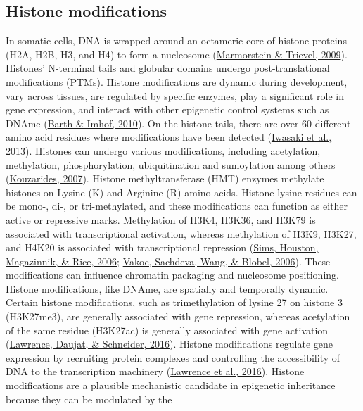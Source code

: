 \documentclass[12pt,twoside]{reedthesis}
\begin{document}
\hypertarget{histone-modifications}{%
\subsection*{Histone modifications}\label{histone-modifications}}

In somatic cells, DNA is wrapped around an octameric core of histone
proteins (H2A, H2B, H3, and H4) to form a nucleosome (\protect\hyperlink{ref-marmorstein2009}{Marmorstein \& Trievel, 2009}).
Histones' N-terminal tails and globular domains undergo
post-translational modifications (PTMs). Histone modifications are
dynamic during development, vary across tissues, are regulated by
specific enzymes, play a significant role in gene expression, and
interact with other epigenetic control systems such as DNAme
(\protect\hyperlink{ref-barth2010}{Barth \& Imhof, 2010}). On the histone tails, there are over 60 different amino
acid residues where modifications have been detected (\protect\hyperlink{ref-iwasaki2013}{Iwasaki et al., 2013}).
Histones can undergo various modifications, including acetylation,
methylation, phosphorylation, ubiquitination and sumoylation among
others (\protect\hyperlink{ref-kouzarides2007}{Kouzarides, 2007}). Histone methyltransferase (HMT) enzymes
methylate histones on Lysine (K) and Arginine (R) amino acids. Histone
lysine residues can be mono-, di-, or tri-methylated, and these
modifications can function as either active or repressive marks.
Methylation of H3K4, H3K36, and H3K79 is associated with transcriptional
activation, whereas methylation of H3K9, H3K27, and H4K20 is associated
with transcriptional repression (\protect\hyperlink{ref-sims2006}{Sims, Houston, Magazinnik, \& Rice, 2006}; \protect\hyperlink{ref-vakoc2006}{Vakoc, Sachdeva, Wang, \& Blobel, 2006}). These
modifications can influence chromatin packaging and nucleosome
positioning. Histone modifications, like DNAme, are spatially and
temporally dynamic. Certain histone modifications, such as
trimethylation of lysine 27 on histone 3 (H3K27me3), are generally
associated with gene repression, whereas acetylation of the same residue
(H3K27ac) is generally associated with gene activation (\protect\hyperlink{ref-lawrence2016}{Lawrence, Daujat, \& Schneider, 2016}).
Histone modifications regulate gene expression by recruiting protein
complexes and controlling the accessibility of DNA to the transcription
machinery (\protect\hyperlink{ref-lawrence2016}{Lawrence et al., 2016}). Histone modifications are a plausible
mechanistic candidate in epigenetic inheritance because they can be modulated by the
\end{document}
